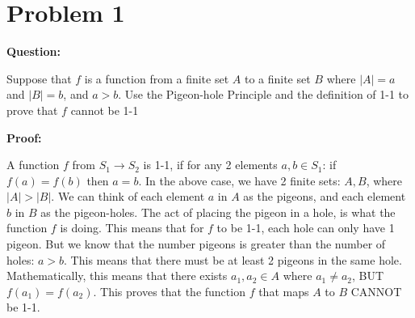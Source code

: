 \documentclass[11pt]{article}
\begin{document}
\section*{Problem 1}

\textbf{Question: }

Suppose that $f$ is a function from a finite set $A$ to a finite set $B$ where $|A|=a$ and $|B|=b$, and $a>b$. Use the Pigeon-hole Principle and the definition of 1-1 to prove that $f$ cannot be 1-1

\textbf{Proof: }

A function $f$ from $S_1 \rightarrow S_2$ is 1-1, if for any 2 elements $a, b \in S_1$: if $f(a)=f(b)$ then $a = b$. In the above case, we have 2 finite sets: $A, B$, where $|A| > |B|$. We can think of each element $a$ in $A$ as the pigeons, and each element $b$ in $B$ as the pigeon-holes. The act of placing the pigeon in a hole, is what the function $f$ is doing. This means that for $f$ to be 1-1, each hole can only have 1 pigeon. But we know that the number pigeons is greater than the number of holes: $a > b$. This means that there must be at least 2 pigeons in the same hole. Mathematically, this means that there exists $a_1, a_2 \in A$ where $a_1 \neq a_2$, BUT $f(a_1) = f(a_2)$. This proves that the function $f$ that maps $A$ to $B$ CANNOT be 1-1.
\end{document}

